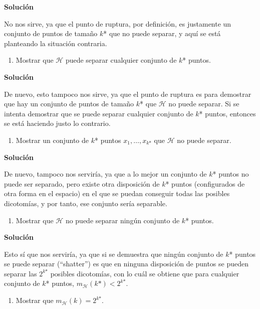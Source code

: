 \documentclass[11pt,a4paper]{article}
\newcommand{\answer}{\noindent\textbf{Solución}}
\begin{document}
\answer

No nos sirve, ya que el punto de ruptura, por definición, es justamente un conjunto de puntos de tamaño $k$* que no puede
separar, y aquí se está planteando la situación contraria.

\begin{enumerate}[resume,label=\textit{\alph*})]
	\item Mostrar que $\mathcal{H}$ puede separar cualquier conjunto de $k$* puntos.
\end{enumerate}

\answer

De nuevo, esto tampoco nos sirve, ya que el punto de ruptura es para demostrar que hay un conjunto de puntos de tamaño
$k$* que $\mathcal{H}$ no puede separar. Si se intenta demostrar que se puede separar cualquier conjunto de $k$* puntos,
entonces se está haciendo justo lo contrario.

\begin{enumerate}[resume,label=\textit{\alph*})]
	\item Mostrar un conjunto de $k$* puntos  $x_1, \dots, x_{k\text{*}}$ que $\mathcal{H}$ no puede separar.
\end{enumerate}

\answer

De nuevo, tampoco nos serviría, ya que a lo mejor un conjunto de $k$* puntos no puede ser separado, pero existe otra
disposición de $k$* puntos (configurados de otra forma en el espacio) en el que se puedan conseguir todas las posibles
dicotomías, y por tanto, ese conjunto sería separable.

\begin{enumerate}[resume,label=\textit{\alph*})]
	\item Mostrar que $\mathcal{H}$ no puede separar ningún conjunto de $k$* puntos.
\end{enumerate}

\answer

Esto sí que nos serviría, ya que si se demuestra que ningún conjunto de $k$* puntos se puede separar (``shatter'') es
que en ninguna disposición de puntos se pueden separar las $2^{k\text{*}}$ posibles dicotomías, con lo cuál se obtiene
que para cualquier conjunto de $k$* puntos, $m_\mathcal{H}(k\text{*}) < 2^{k\text{*}}$.

\begin{enumerate}[resume,label=\textit{\alph*})]
	\item Mostrar que $m_\mathcal{H}(k) = 2^{k\text{*}}$.
\end{enumerate}
\end{document}
